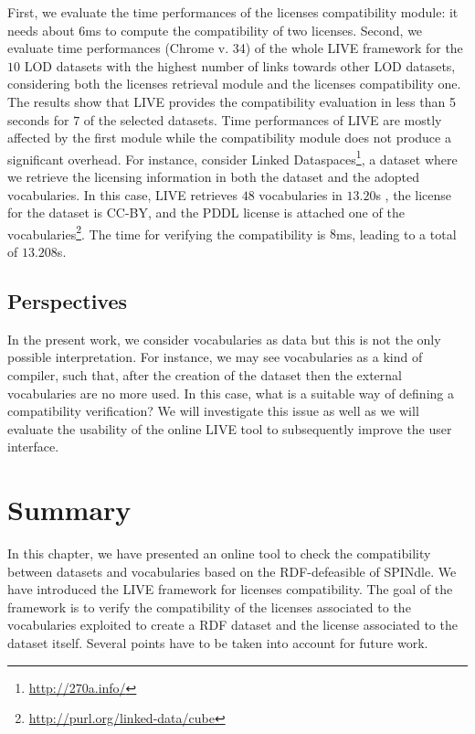 First, we evaluate the time performances of the licenses compatibility module: it needs about 6ms to compute the compatibility of two licenses. Second, we evaluate time performances (Chrome v. 34) of the whole LIVE framework for the $10$ LOD datasets with the highest number of links towards other LOD datasets, considering both the licenses retrieval module and the licenses compatibility one. The results show that LIVE provides the compatibility evaluation in less than 5 seconds for $7$ of the selected datasets. Time performances of LIVE are mostly affected by the first module while the compatibility module does not produce a significant overhead. For instance, consider Linked Dataspaces\footnote{\url{http://270a.info/}}, a dataset where we retrieve the licensing information in both the dataset and the adopted vocabularies. In this case, LIVE retrieves $48$ vocabularies in $13.20$s , the license for the dataset is CC-BY, and the PDDL license is attached one of the vocabularies\footnote{\url{http://purl.org/linked-data/cube}}. The time for verifying the compatibility is $8$ms, leading to a total of $13.208$s.

\subsection{Perspectives}\label{sec:perspec}
In the present work, we consider vocabularies as data but this is not the only possible interpretation. For instance, we may see vocabularies as a kind of compiler, such that, after the creation of the dataset then the external vocabularies are no more used. In this case, what is a suitable way of defining a compatibility verification? We will investigate this issue as well as we will evaluate the usability of the online LIVE tool to subsequently improve the user interface.

\section{Summary}
\label{sec:summary-ch6}
In this chapter, we have presented an online tool to check the compatibility between datasets and vocabularies based on the RDF-defeasible of SPINdle. We have introduced the LIVE framework for licenses compatibility. The goal of the framework is to verify the compatibility of the licenses associated to the vocabularies exploited to create a RDF dataset and the license associated to the dataset itself. Several points have to be taken into account for future work. 

